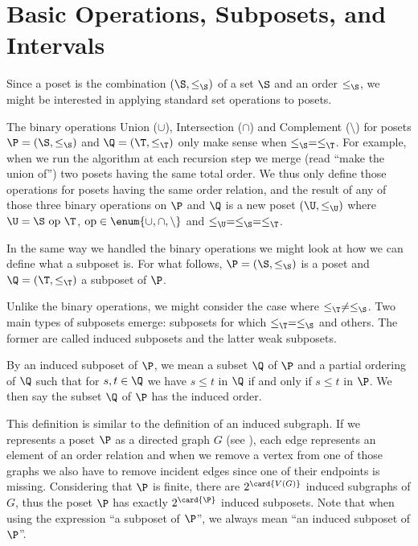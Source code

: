 \section{Basic Operations, Subposets, and Intervals}
\label{tree:poset:sub}


Since a poset is the combination $(\S, \le_{\S})$ of a set $\S$ and an order
$\le_{\S}$, we might be interested in applying standard set operations to posets.

The binary operations Union ($\cup$), Intersection ($\cap$) and Complement
($\setminus$) for posets $\P = (\S, \le_{\S})$ and $\Q = (\T, \le_{\T})$ only make sense
when $\le_{\S} = \le_{\T}$. For example, when we run the algorithm \mergesort at each
recursion step we merge (read ``make the union of'') two posets having the same
total order. We thus only define those operations for posets having the same
order relation, and the result of any of those three binary operations on $\P$
and $\Q$ is a new poset $(\U, \le_{\U})$ where $\U = \S~\text{op}~\T$,
\(\text{op} \in \enum{\cup,\cap,\setminus}\) and $\le_{\U} =
\le_{\S} = \le_{\T}$.


In the same way we handled the binary operations we might look at how we can
define what a subposet is. For what follows, $\P = (\S, \le_{\S})$ is a poset
and $\Q = (\T, \le_{\T})$ a subposet of $\P$.

Unlike the binary operations, we might consider the case where $\le_{\T} \neq
\le_{\S}$. Two main types of subposets emerge: subposets for which $\le_{\T} =
\le_{\S}$ and others. The former are called induced subposets and the latter
weak subposets.
\begin{definition}
By an induced subposet of $\P$, we mean a subset $\Q$ of $\P$ and a partial
ordering of $\Q$ such that for $s, t \in \Q$ we have $s \leq t$ in $\Q$ if and
only if $s \leq t$ in $\P$. We then say the subset $\Q$ of $\P$ has the induced
order.
\end{definition}

This definition is similar to the definition of an induced subgraph. If we
represents a poset $\P$ as a directed graph $G$ (see
), each edge represents an element of an order relation
and when we remove a vertex from one of those graphs we also have to remove
incident edges since one of their endpoints is missing. Considering that $\P$ is
finite, there are $2^{\card{V(G)}}$ induced subgraphs of $G$, thus the poset $\P$ has
exactly $2^{\card{\P}}$ induced subposets. Note that when using the expression
``a subposet of $\P$'', we always mean ``an induced subposet of $\P$''.

